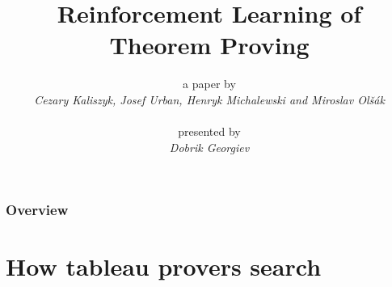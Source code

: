 \documentclass{beamer}
\title[RL of Theorem Proving]{Reinforcement Learning of Theorem Proving} %
\date{} %
\author{{\footnotesize a paper by}\\\textit{Cezary Kaliszyk, Josef Urban,
Henryk Michalewski and Miroslav Ol\v{s}{\'{a}}k}\\~\\{\footnotesize
presented by}\\\textit{Dobrik Georgiev}}
\begin{document}
\begin{frame}
\titlepage %
\end{frame}

\begin{frame}
\frametitle{Overview} %
\tableofcontents %
\end{frame}
\section{How tableau provers search} 
\end{document}
